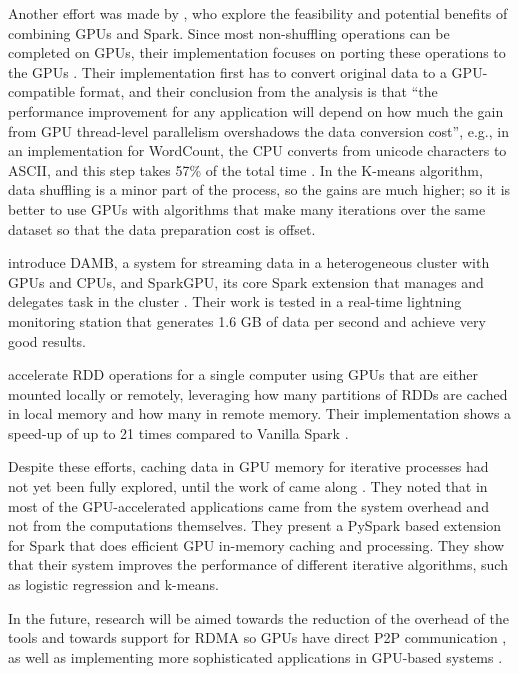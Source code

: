 \documentclass{article}
\begin{document}
Another effort was made by \citeauthor{Manzi2016}, who explore the feasibility and potential benefits of combining GPUs and Spark. Since most non-shuffling operations can be completed on GPUs, their implementation focuses on porting these operations to the GPUs \cite{Manzi2016}. Their implementation first has to convert original data to a GPU-compatible format, and their conclusion from the analysis is that ``the performance improvement for any application will depend on how much the gain from GPU thread-level parallelism overshadows the data conversion cost'', e.g., in an implementation for WordCount, the CPU converts from unicode characters to ASCII, and this step takes 57\% of the total time \cite{Manzi2016}. In the K-means algorithm, data shuffling is a minor part of the process, so the gains are much higher; so it is better to use GPUs with algorithms that make many iterations over the same dataset so that the data preparation cost is offset.

\citeauthor{Hassaan2016} introduce DAMB, a system for streaming data in a heterogeneous cluster with GPUs and CPUs, and SparkGPU, its core Spark extension that manages and delegates task in the cluster \cite{Hassaan2016}. Their work is tested in a real-time lightning monitoring station that generates 1.6 GB of data per second and achieve very good results. 

\citeauthor{Ohno2017} accelerate RDD operations for a single computer using GPUs that are either mounted locally or remotely, leveraging how many partitions of RDDs are cached in local memory and how many in remote memory. Their implementation shows a speed-up of up to 21 times compared to Vanilla Spark \cite{Ohno2017}.

Despite these efforts, caching data in GPU memory for iterative processes had not yet been fully explored, until the work of \citeauthor{Hong2017} came along \cite{Hong2017}. They noted that in most of the GPU-accelerated applications came from the system overhead and not from the computations themselves. They present a PySpark based extension for Spark that does efficient GPU in-memory caching and processing. They show that their system improves the performance of different iterative algorithms, such as logistic regression and k-means.

In the future, research will be aimed towards the reduction of the overhead of the tools and towards support for RDMA so GPUs have direct P2P communication \cite{Hong2017}, as well as implementing more sophisticated applications in GPU-based systems \cite{Ohno2017}.
\end{document}
